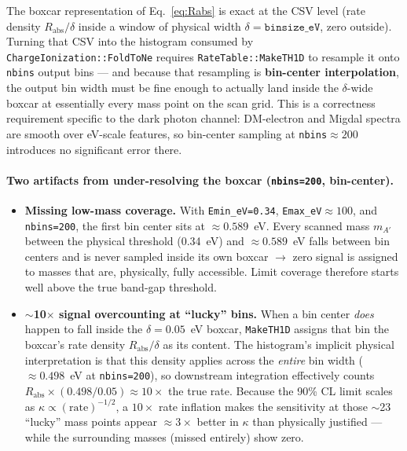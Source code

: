 The boxcar representation of Eq.~\eqref{eq:Rabs} is exact at the CSV level
(rate density $R_\mathrm{abs}/\delta$ inside a window of physical width
$\delta=\texttt{binsize\_eV}$, zero outside). Turning that CSV into the
histogram consumed by \texttt{ChargeIonization::FoldToNe} requires
\texttt{RateTable::MakeTH1D} to resample it onto \texttt{nbins} output
bins — and because that resampling is \textbf{bin-center interpolation},
the output bin width must be fine enough to actually land inside the
$\delta$-wide boxcar at essentially every mass point on the scan grid. This
is a correctness requirement specific to the dark photon channel:
DM-electron and Migdal spectra are smooth over eV-scale features, so
bin-center sampling at \texttt{nbins}$\approx200$ introduces no significant
error there.

\paragraph{Two artifacts from under-resolving the boxcar
(\texttt{nbins=200}, bin-center).}
\begin{itemize}[leftmargin=*]
  \item \textbf{Missing low-mass coverage.} With \texttt{Emin\_eV=0.34},
  \texttt{Emax\_eV}$\approx100$, and \texttt{nbins=200}, the first bin
  center sits at $\approx0.589$~eV. Every scanned mass $m_{A'}$ between the
  physical threshold (0.34~eV) and $\approx0.589$~eV falls between bin
  centers and is never sampled inside its own boxcar $\to$ zero signal is
  assigned to masses that are, physically, fully accessible. Limit coverage
  therefore starts well above the true band-gap threshold.
  \item \textbf{$\sim$10$\times$ signal overcounting at ``lucky'' bins.}
  When a bin center \emph{does} happen to fall inside the $\delta=0.05$~eV
  boxcar, \texttt{MakeTH1D} assigns that bin the boxcar's rate density
  $R_\mathrm{abs}/\delta$ as its content. The histogram's implicit physical
  interpretation is that this density applies across the \emph{entire} bin
  width ($\approx0.498$~eV at \texttt{nbins=200}), so downstream
  integration effectively counts $R_\mathrm{abs}\times(0.498/0.05)\approx
  10\times$ the true rate. Because the 90\% CL limit scales as
  $\kappa\propto(\text{rate})^{-1/2}$, a $10\times$ rate inflation makes the
  sensitivity at those $\sim$23 ``lucky'' mass points appear $\approx3\times$
  better in $\kappa$ than physically justified — while the surrounding
  masses (missed entirely) show zero.
\end{itemize}

